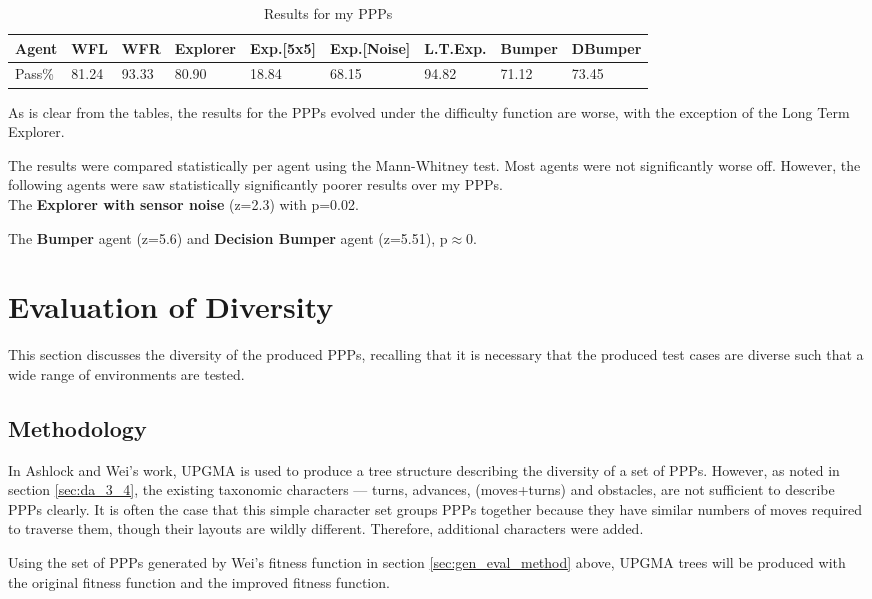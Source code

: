 \documentclass[authoryearcitations]{UoYCSproject}
\begin{document}
\begin{table}
\begin{tabular}{|l|l|l|l|l|l|l|l|l|}
\hline
Agent&WFL&WFR&Explorer&Exp.[5x5]&Exp.[Noise]&L.T.Exp.&Bumper&DBumper\\
\hline

Pass\%&81.24&93.33&80.90&18.84&68.15&94.82&71.12&73.45\\
\hline
\end{tabular}
\caption{Results for my PPPs}
\label{table:diff_eval}
\end{table}

As is clear from the tables, the results for the PPPs evolved under the difficulty function are worse, with the exception of the Long Term Explorer.

The results were compared statistically per agent using the Mann-Whitney test. Most agents were not significantly worse off. However, the following agents were saw statistically significantly poorer results over my PPPs. \\

The \textbf{Explorer with sensor noise} (z=2.3) with p=0.02.

The \textbf{Bumper} agent (z=5.6) and \textbf{Decision Bumper} agent (z=5.51), p$\approx$0.

\section{Evaluation of Diversity}
\label{sec:div_eval}
This section discusses the diversity of the produced PPPs, recalling that it is necessary that the produced test cases are diverse such that a wide range of environments are tested.

\subsection{Methodology}
\label{sec:div_eval_method}
In Ashlock and Wei's work, UPGMA is used to produce a tree structure describing the diversity of a set of PPPs. However, as noted in section \ref{sec:da_3_4}, the existing taxonomic characters --- turns, advances, (moves+turns) and obstacles, are not sufficient to describe PPPs clearly. It is often the case that this simple character set groups PPPs together because they have similar numbers of moves required to traverse them, though their layouts are wildly different. Therefore, additional characters were added.

Using the set of PPPs generated by Wei's fitness function in section \ref{sec:gen_eval_method} above, UPGMA trees will be produced with the original fitness function and the improved fitness function.
\end{document}
